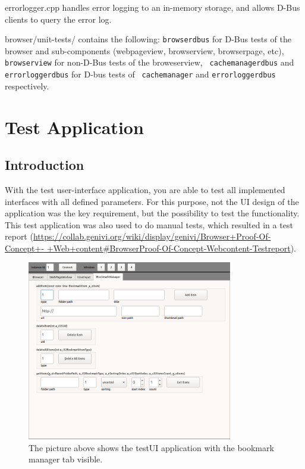 \documentclass{pelagicore}
\begin{document}
errorlogger.cpp handles error logging to an in-memory storage, and allows
D-Bus clients to query the error log.

browser/unit-tests/ contains the following: {\tt browserdbus} for D-Bus tests
of the browser and sub-components (webpageview, browserview, browserpage, etc),
{\tt browserview} for non-D-Bus tests of the broweserview, {\tt
cachemanagerdbus} and {\tt errorloggerdbus} for D-bus tests of {\tt
cachemanager} and {\tt errorloggerdbus} respectively.

\section{Test Application}
\subsection{Introduction}
With the test user-interface application, you are able to test all implemented
interfaces with all defined parameters. For this purpose, not the UI design of
the application was the key requirement, but the possibility to test the
functionality. This test application was also used to do manual tests, which
resulted in a test report
(\url{https://collab.genivi.org/wiki/display/genivi/Browser+Proof-Of-Concept+-
+Web+content#BrowserProof-Of-Concept-Webcontent-Testreport}).

\begin{figure}[!ht]
    \center
    \includegraphics[width=0.8\textwidth]{testui.png}
    \caption{The picture above shows the testUI application with the bookmark
             manager tab visible.}
\end{figure}
\end{document}
